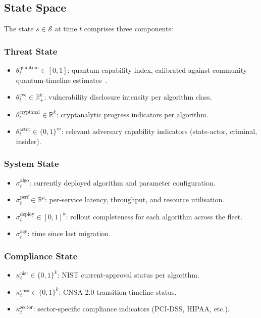 \documentclass[sigconf,nonacm]{acmart}
\begin{document}
\subsection{State Space}

The state $s \in \mathcal{S}$ at time $t$ comprises three components:

\subsubsection{Threat State}

\begin{itemize}
  \item $\theta_t^{\text{quantum}} \in [0,1]$: quantum capability
        index, calibrated against community quantum-timeline
        estimates~\cite{mosca2024quantum}.
  \item $\theta_t^{\text{cve}} \in \mathbb{R}_+^k$: vulnerability
        disclosure intensity per algorithm class.
  \item $\theta_t^{\text{cryptanal}} \in \mathbb{R}^k$: cryptanalytic
        progress indicators per algorithm.
  \item $\theta_t^{\text{actor}} \in \{0,1\}^m$: relevant adversary
        capability indicators (state-actor, criminal, insider).
\end{itemize}

\subsubsection{System State}

\begin{itemize}
  \item $\sigma_t^{\text{algo}}$: currently deployed algorithm and
        parameter configuration.
  \item $\sigma_t^{\text{perf}} \in \mathbb{R}^p$: per-service latency,
        throughput, and resource utilisation.
  \item $\sigma_t^{\text{deploy}} \in [0,1]^k$: rollout completeness
        for each algorithm across the fleet.
  \item $\sigma_t^{\text{age}}$: time since last migration.
\end{itemize}

\subsubsection{Compliance State}

\begin{itemize}
  \item $\kappa_t^{\text{nist}} \in \{0,1\}^k$: NIST current-approval
        status per algorithm.
  \item $\kappa_t^{\text{cnsa}} \in \{0,1\}^k$: CNSA 2.0 transition
        timeline status.
  \item $\kappa_t^{\text{sector}}$: sector-specific compliance
        indicators (PCI-DSS, HIPAA, etc.).
\end{itemize}
\end{document}

